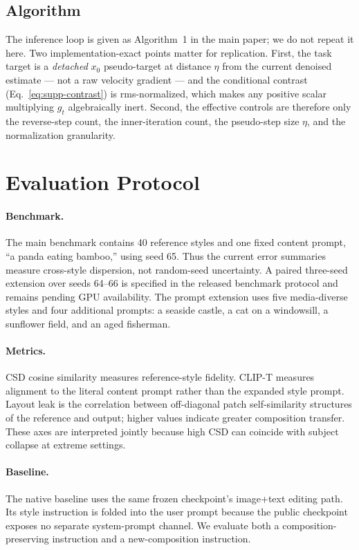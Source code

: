 \documentclass[letterpaper]{article}
\begin{document}
\subsection{Algorithm}

The inference loop is given as Algorithm~1 in the main paper; we do not repeat it
here. Two implementation-exact points matter for replication. First, the task
target is a \emph{detached} $x_0$ pseudo-target at distance $\eta$ from the
current denoised estimate --- not a raw velocity gradient --- and the conditional
contrast (Eq.~\ref{eq:supp-contrast}) is rms-normalized, which makes any positive
scalar multiplying $g_t$ algebraically inert. Second, the effective controls are
therefore only the reverse-step count, the inner-iteration count, the pseudo-step
size $\eta$, and the normalization granularity.

\section{Evaluation Protocol}

\paragraph{Benchmark.}
The main benchmark contains 40 reference styles and one fixed content prompt,
``a panda eating bamboo,'' using seed 65. Thus the current error summaries
measure cross-style dispersion, not random-seed uncertainty. A paired
three-seed extension over seeds 64--66 is specified in the released benchmark
protocol and remains pending GPU availability. The prompt extension uses five
media-diverse styles and four additional prompts: a seaside castle, a cat on a
windowsill, a sunflower field, and an aged fisherman.

\paragraph{Metrics.}
CSD cosine similarity measures reference-style fidelity. CLIP-T measures
alignment to the literal content prompt rather than the expanded style prompt.
Layout leak is the correlation between off-diagonal patch self-similarity
structures of the reference and output; higher values indicate greater
composition transfer. These axes are interpreted jointly because high CSD can
coincide with subject collapse at extreme settings.

\paragraph{Baseline.}
The native baseline uses the same frozen checkpoint's image+text editing path.
Its style instruction is folded into the user prompt because the public
checkpoint exposes no separate system-prompt channel. We evaluate both a
composition-preserving instruction and a new-composition instruction.
\end{document}
